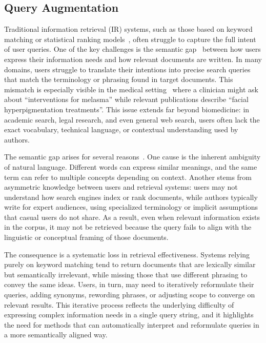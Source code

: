 \subsection{Query Augmentation}
Traditional information retrieval (IR) systems, such as those based on keyword matching or statistical ranking models~\cite{roshdi2015information},  often struggle to capture the full intent of user queries. One of the key challenges is the semantic gap~\cite{farivar2025semantic} between how users express their information needs and how relevant documents are written. In many domains, users struggle to translate their intentions into precise search queries that match the terminology or phrasing found in target documents. This mismatch is especially visible in the medical setting~\cite{koopman2012towards} where a clinician might ask about “interventions for melasma” while relevant publications describe “facial hyperpigmentation treatments”. This issue extends far beyond biomedicine: in academic search, legal research, and even general web search, users often lack the exact vocabulary, technical language, or contextual understanding used by authors.

The semantic gap arises for several reasons~\cite{farivar2025semantic}. One cause is the inherent ambiguity of natural language. Different words can express similar meanings, and the same term can refer to multiple concepts depending on context. Another stems from asymmetric knowledge between users and retrieval systems: users may not understand how search engines index or rank documents, while authors typically write for expert audiences, using specialized terminology or implicit assumptions that casual users do not share. As a result, even when relevant information exists in the corpus, it may not be retrieved because the query fails to align with the linguistic or conceptual framing of those documents.

The consequence is a systematic loss in retrieval effectiveness. Systems relying purely on keyword matching tend to return documents that are lexically similar but semantically irrelevant, while missing those that use different phrasing to convey the same ideas. Users, in turn, may need to iteratively reformulate their queries, adding synonyms, rewording phrases, or adjusting scope to converge on relevant results. This iterative process reflects the underlying difficulty of expressing complex information needs in a single query string, and it highlights the need for methods that can automatically interpret and reformulate queries in a more semantically aligned way.

